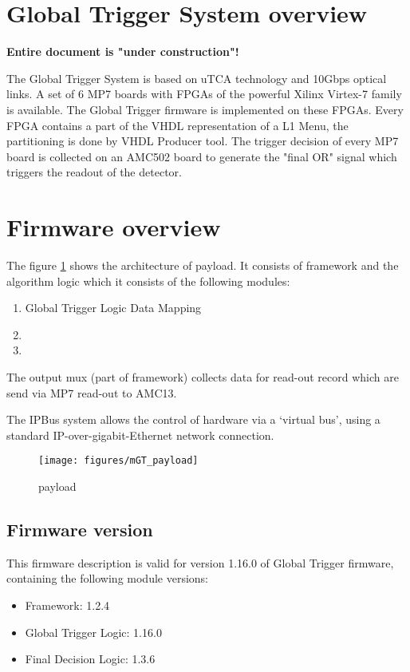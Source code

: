 \section{Global Trigger System overview}\label{sec:gt_system}

\textbf{Entire document is "under construction"!}

The Global Trigger System is based on uTCA technology and 10Gbps optical links. A set of 6 MP7 boards with FPGAs of the powerful Xilinx Virtex-7 family is available. The Global Trigger firmware is implemented on these FPGAs. Every FPGA contains a part of the VHDL representation of a L1 Menu, the partitioning is done by VHDL Producer tool. The trigger decision of every MP7 board is collected on an AMC502 board to generate the "final OR" signal
which triggers the readout of the detector.

\section{Firmware overview}\label{sec:fw}
The figure \ref{fig:mgt} shows the architecture of \ugt payload. It consists of framework and the algorithm logic which it consists of the following modules:
\begin{enumerate}
\item Global Trigger Logic Data Mapping
\item \ugtl
\item \ufdl
\end{enumerate}

The output mux (part of framework) collects data for read-out record which are send via MP7 read-out to AMC13.

The IPBus system allows the control of hardware via a ‘virtual bus’, using a standard IP-over-gigabit-Ethernet network connection.
\begin{figure}[h!]
   \centering
    \texttt{[image: figures/mGT\_payload]}
    \caption{\ugt payload}\label{fig:mgt}
 \end{figure}

\subsection{Firmware version}\label{sec:fw_version}

This firmware description is valid for version 1.16.0 of Global Trigger firmware, containing the following module versions:
\begin{itemize}
\item Framework: 1.2.4
\item Global Trigger Logic: 1.16.0
\item Final Decision Logic: 1.3.6
\end{itemize}

